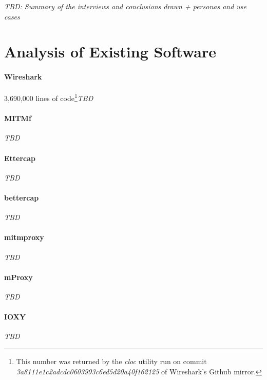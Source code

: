 \emph{TBD: Summary of the interviews and conclusions drawn + personas and use cases}

\section{Analysis of Existing Software}
\paragraph{Wireshark} 3,690,000 lines of code\footnote{This number was returned by the \emph{cloc} utility run on commit \emph{3a8111e1c2adcdc0603993c6ed5d20a40f162125} of Wireshark's Github mirror.}\emph{TBD}
\paragraph{MITMf} \emph{TBD}
\paragraph{Ettercap} \emph{TBD}
\paragraph{bettercap} \emph{TBD}
\paragraph{mitmproxy} \emph{TBD}
\paragraph{mProxy} \emph{TBD}
\paragraph{IOXY} \emph{TBD}

